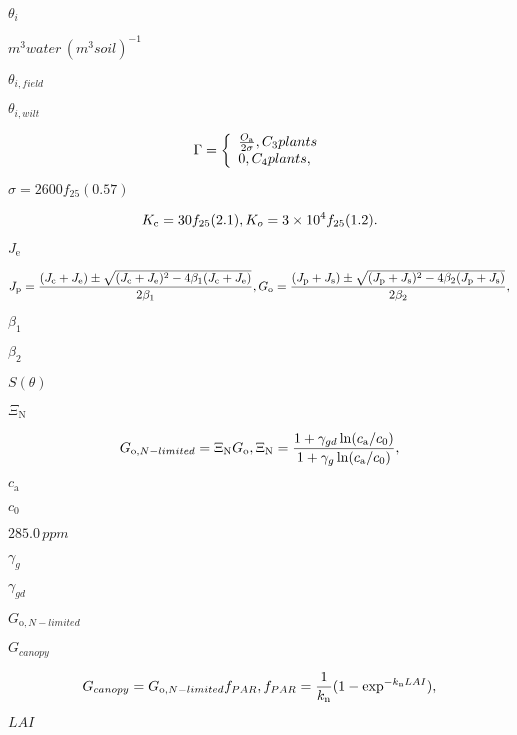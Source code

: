 \documentclass{article}
\begin{document}
{$\theta_{i}$
\pagebreak

$m^{3} water\,(m^{3} soil)^{-1}$
\pagebreak

$\theta_{i,field}$
\pagebreak

$\theta_{i, wilt}$
\pagebreak

\[ \label{co2comp} \Gamma = \left\{\begin{array}{l l} \frac{O_\mathrm{a}}{2 \sigma}, C_3 plants\\ 0, C_4 plants, \end{array} \right. \]
\pagebreak

$\sigma = 2600f_{25}(0.57)$
\pagebreak

\[ \label{K_c} K_\mathrm{c} = 30f_{25}(2.1), \\ \label{K_o} K_o = 3 \times 10^4 f_{25}(1.2). \]
\pagebreak

$J_\mathrm{e}$
\pagebreak

\[ J_\mathrm{p} = \frac{(J_\mathrm{c} + J_\mathrm{e}) \pm \sqrt{(J_\mathrm{c} + J_\mathrm{e})^2 - 4\beta_1 (J_\mathrm{c} + J_\mathrm{e})}}{2\beta_1} , \\ \label{G_o}G_\mathrm{o} = \frac{(J_\mathrm{p} + J_\mathrm{s}) \pm \sqrt{(J_\mathrm{p} + J_\mathrm{s})^2 - 4\beta_2 (J_\mathrm{p} + J_\mathrm{s})}}{2\beta_2}, \]
\pagebreak

$\beta_1$
\pagebreak

$\beta_2$
\pagebreak

$S(\theta)$
\pagebreak

$\Xi_\mathrm{N}$
\pagebreak

\[ \label{G_nitro} G_{\mathrm{o},N-limited} = \Xi_\mathrm{N} G_\mathrm{o}, \\ \label{Nthrottle} \Xi_\mathrm{N} = \frac{1 + \gamma_{gd} \ln(c_\mathrm{a}/c_{0})}{1 + \gamma_g \ln(c_\mathrm{a}/c_{0})}, \]
\pagebreak

$c_\mathrm{a}$
\pagebreak

$c_{0}$
\pagebreak

$285.0\,ppm$
\pagebreak

$\gamma_g$
\pagebreak

$\gamma_{gd}$
\pagebreak

$G_{\mathrm{o},N-limited}$
\pagebreak

$G_{canopy}$
\pagebreak

\[ \label{G_canopy} G_{canopy} = G_{\mathrm{o},N-limited} f_{PAR},\\ \label{fpar} f_{PAR} = \frac{1}{k_\mathrm{n}}(1-\exp^{-k_\mathrm{n}LAI}), \]
\pagebreak

$LAI$
\pagebreak

}
\end{document}
